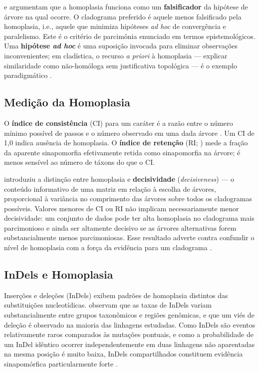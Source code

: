 \textcite{farris1983} e \textcite{kluge2009} argumentam que a homoplasia funciona como um \textbf{falsificador} da hipótese de árvore na qual ocorre. O cladograma preferido é aquele menos falsificado pela homoplasia, i.e., aquele que minimiza hipóteses \textit{ad hoc} de convergência e paralelismo. Este é o critério de parcimônia enunciado em termos epistemológicos. Uma \textbf{hipótese \textit{ad hoc}} é uma suposição invocada para eliminar observações inconvenientes; em cladística, o recurso \textit{a priori} à homoplasia --- explicar similaridade como não-homóloga sem justificativa topológica --- é o exemplo paradigmático \parencite{grant2004a}.

\subsection{Medição da Homoplasia}

O \textbf{índice de consistência} (CI) para um caráter é a razão entre o número mínimo possível de passos e o número observado em uma dada árvore \parencite{klugeanfarris1969}. Um CI de 1,0 indica ausência de homoplasia. O \textbf{índice de retenção} (RI; \cite{farris1989}) mede a fração da aparente sinapomorfia efetivamente retida como sinapomorfia na árvore; é menos sensível ao número de táxons do que o CI.

\textcite{goloboff1991} introduziu a distinção entre homoplasia e \textbf{decisividade} (\textit{decisiveness}) --- o conteúdo informativo de uma matriz em relação à escolha de árvores, proporcional à variância no comprimento das árvores sobre todos os cladogramas possíveis. Valores menores de CI ou RI não implicam necessariamente menor decisividade: um conjunto de dados pode ter alta homoplasia no cladograma mais parcimonioso e ainda ser altamente decisivo se as árvores alternativas forem substancialmente menos parcimoniosas. Esse resultado adverte contra confundir o nível de homoplasia com a força da evidência para um cladograma \parencite{goloboff1991}.

\subsection{InDels e Homoplasia}

Inserções e deleções (InDels) exibem padrões de homoplasia distintos das substituições nucleotídicas. \textcite{redelings2024} observam que as taxas de InDels variam substancialmente entre grupos taxonômicos e regiões genômicas, e que um viés de deleção é observado na maioria das linhagens estudadas. Como InDels são eventos relativamente raros comparados às mutações pontuais, e como a probabilidade de um InDel idêntico ocorrer independentemente em duas linhagens não aparentadas na mesma posição é muito baixa, InDels compartilhados constituem evidência sinapomórfica particularmente forte \parencite{redelings2024}.

